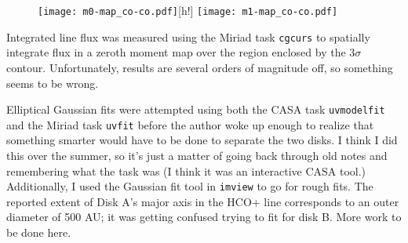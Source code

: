 \begin{figure}
\centering
\texttt{[image: m0-map\_co-co.pdf]}[h!]
  \label{fig:CO_m0}
  \texttt{[image: m1-map\_co-co.pdf]}
  \label{fig:CO_m1}
\end{figure}



Integrated line flux was measured using the Miriad task \texttt{cgcurs} to spatially integrate flux in a zeroth moment map over the region enclosed by the 3$\sigma$ contour. Unfortunately, results are several orders of magnitude off, so something seems to be wrong.

Elliptical Gaussian fits were attempted using both the CASA task \texttt{uvmodelfit} and the Miriad task \texttt{uvfit} before the author woke up enough to realize that something smarter would have to be done to separate the two disks. I think I did this over the summer, so it's just a matter of going back through old notes and remembering what the task was (I think it was an interactive CASA tool.) Additionally, I used the Gaussian fit tool in \texttt{imview} to go for rough fits. The reported extent of Disk A's major axis in the HCO+ line corresponds to an outer diameter of 500 AU; it was getting confused trying to fit for disk B. More work to be done here.




\iffalse
Tables 2 and 3 present the velocity-integrated line fluxes and the best-fit parameters for a simple elliptical Gaussian fit to the visibilities for each disk, respectively. Integrated line flux was measured using the MIRIAD task \texttt{cgcurs} to integrate the intensity in the zeroth-moment map throughout the region enclosed by the 3 $\sigma$ contour level. Uncertainties in the integrated line flux do not include the 10\% absolute flux calibration uncertainty inherent in the ALMA observations caused by uncertainties int he models of solar system objects used as flux callibrators. Elliptical Gaussian fits of the visibilities were performed using the MIRIAD task \texttt{uvfit}.
\fi

